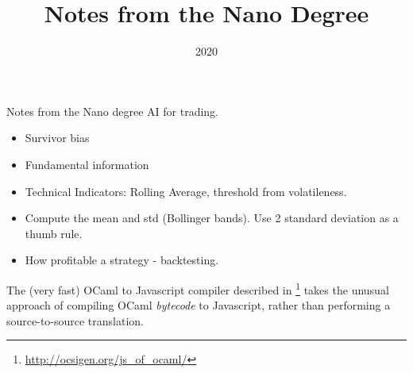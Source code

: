 \documentclass[a4paper]{tufte-handout}
\title{Notes from the Nano Degree}
\date{2020}
\begin{document}
\maketitle


\begin{projects}
    \begin{description}
        \item Notes from the Nano degree AI for trading.
    \end{description}
\end{projects}




\begin{itemize}
    \item Survivor bias
    \item Fundamental information
    \item Technical Indicators: Rolling Average, threshold from volatileness.
    \item Compute the mean and std (Bollinger bands). Use 2 standard deviation as a thumb rule.
    \item How profitable a strategy - backtesting.
\end{itemize}

\hrulefill



The (very fast) OCaml to Javascript compiler described in \citep{VouillonBalat13}\footnote{\url{http://ocsigen.org/js_of_ocaml/}} takes the unusual approach of compiling OCaml \textit{bytecode} to Javascript, rather than performing a source-to-source translation.

\hrulefill








\end{document}
